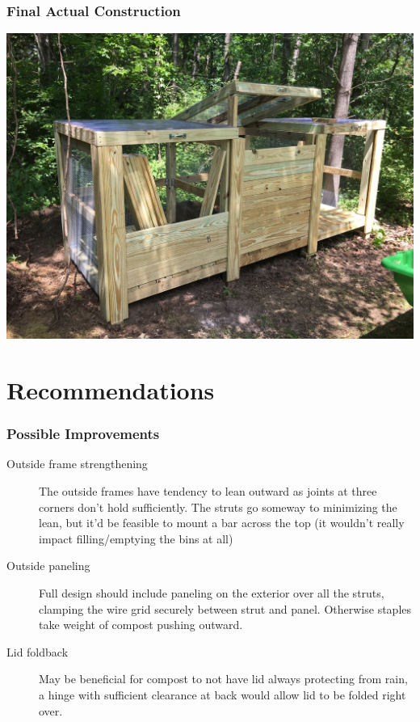 \documentclass{beamer}
\begin{document}
\begin{frame}
  \frametitle{Final Actual Construction}
  \begin{center}
  \includegraphics[width=.85\textwidth]{images/actual_finished.JPG}
  \end{center}
\end{frame}

\section{Recommendations}

\begin{frame}
  \frametitle{Possible Improvements}
  \begin{description}
  \item[Outside frame strengthening] The outside frames have tendency to lean outward as joints at three corners don't hold sufficiently. The struts go someway to minimizing the lean, but it'd be feasible to mount a bar across the top (it wouldn't really impact filling/emptying the bins at all)
  \item[Outside paneling] Full design should include paneling on the exterior over all the struts, clamping the wire grid securely between strut and panel. Otherwise staples take weight of compost pushing outward.
    \item[Lid foldback] May be beneficial for compost to not have lid always protecting from rain, a hinge with sufficient clearance at back would allow lid to be folded right over.
  \end{description}
\end{frame}
\end{document}
